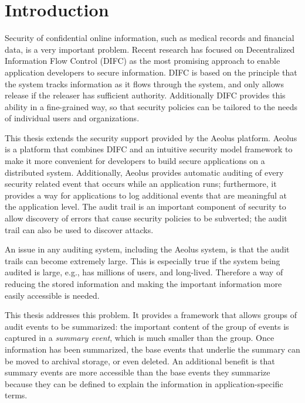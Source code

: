 \chapter{Introduction}

Security of confidential online information, such as medical records and financial data, is a very important problem. Recent research has focused on Decentralized Information Flow Control (DIFC) as the most promising approach to enable application developers to secure information. DIFC is based on the principle that the system tracks information as it flows through the system, and only allows release if the releaser has sufficient authority. Additionally DIFC provides this ability in a fine-grained way, so that security policies can be tailored to the needs of individual users and organizations.

This thesis extends the security support provided by the Aeolus platform. Aeolus is a platform that combines DIFC and an intuitive security model framework to make it more convenient for developers to build secure applications on a distributed system. Additionally, Aeolus provides automatic auditing of every security related event that occurs while an application runs; furthermore, it provides a way for applications to log additional events that are meaningful at the application level. The audit trail is an important component of security to allow discovery of errors that cause security policies to be subverted; the audit trail can also be used to discover attacks.

An issue in any auditing system, including the Aeolus system, is that the audit trails can become extremely large. This is especially true if the system being audited is large, e.g., has millions of users, and long-lived. Therefore a way of reducing the stored information and making the important information more easily accessible is needed.

This thesis addresses this problem. It provides a framework that allows groups of audit events to be summarized: the important content of the group of events is captured in a \emph{summary event}, which is much smaller than the group. Once information has been summarized, the base events that underlie the summary can be moved to archival storage, or even deleted.  An additional benefit is that summary events are more accessible than the base events they summarize because they can be defined to explain the information in application-specific terms.

